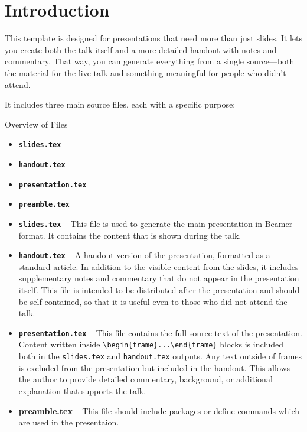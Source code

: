 
\section{Introduction}

This template is designed for presentations that need more than just slides. It
lets you create both the talk itself and a more detailed handout with notes and
commentary. That way, you can generate everything from a single source—both the
material for the live talk and something meaningful for people who didn’t
attend.

It includes three main source files, each with a specific purpose:

\begin{frame}[fragile]{Overview of Files}
  \begin{itemize}
   \item \textbf{\texttt{slides.tex}} 
   \item \textbf{\texttt{handout.tex}}
   \item \textbf{\texttt{presentation.tex}}
   \item \textbf{\texttt{preamble.tex}}
  \end{itemize}
\end{frame}
\begin{itemize}
  \item \textbf{\texttt{slides.tex}} – This file is used to generate the main presentation in Beamer format. It contains the content that is shown during the talk.
  
  \item \textbf{\texttt{handout.tex}} – A handout version of the presentation, formatted as a standard article. In addition to the visible content from the slides, it includes supplementary notes and commentary that do not appear in the presentation itself. This file is intended to be distributed after the presentation and should be self-contained, so that it is useful even to those who did not attend the talk.
  
  \item \textbf{\texttt{presentation.tex}} – This file contains the full source text of the presentation. Content written inside \verb|\begin{frame}...\end{frame}| blocks is included both in the \texttt{slides.tex} and \texttt{handout.tex} outputs. Any text outside of frames is excluded from the presentation but included in the handout. This allows the author to provide detailed commentary, background, or additional explanation that supports the talk.

  \item  \textbf{preamble.tex} – This file should include packages or define commands which are used in the presentaion. 
\end{itemize}


